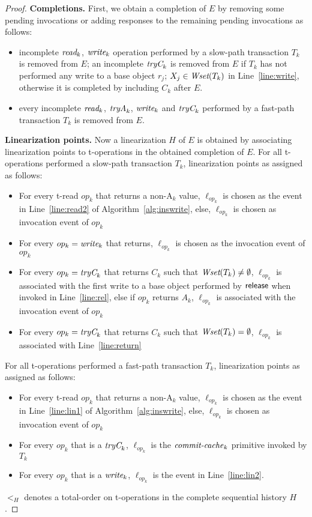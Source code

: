 \begin{proof}
\vspace{1mm}\noindent\textbf{Completions.}
First, we obtain a completion of $E$ by removing some pending
invocations or adding responses to the remaining pending invocations
as follows:
%
\begin{itemize}
\item
incomplete $\textit{read}_k$, $\textit{write}_k$ operation performed by a slow-path transaction $T_k$ is removed from $E$;
an incomplete $\textit{tryC}_k$ is removed from $E$ if $T_k$ has not performed any write to a base object $r_j$; $X_j \in \textit{Wset}(T_k)$
in Line~\ref{line:write}, otherwise it is completed by including $C_k$ after $E$.
\item
every incomplete $\textit{read}_k$, $\textit{tryA}_k$, $\textit{write}_k$ and $\textit{tryC}_k$ performed by a fast-path transaction $T_k$ is removed from $E$.
\end{itemize}
%
\vspace{1mm}\noindent\textbf{Linearization points.}
Now a linearization $H$ of $E$ is obtained by associating linearization points to
t-operations in the obtained completion of $E$.
For all t-operations performed a slow-path transaction $T_k$, linearization points as assigned as follows:
%
\begin{itemize}
\item For every t-read $op_k$ that returns a non-A$_k$ value, $\ell_{op_k}$ is chosen as the event in Line~\ref{line:read2}
of Algorithm~\ref{alg:inswrite}, else, $\ell_{op_k}$ is chosen as invocation event of $op_k$
\item For every $op_k=\textit{write}_k$ that returns, $\ell_{op_k}$ is chosen as the invocation event of $op_k$
\item For every $op_k=\textit{tryC}_k$ that returns $C_k$ such that $\textit{Wset}(T_k)
  \neq \emptyset$, $\ell_{op_k}$ is associated with the first write to a base object performed by $\lit{release}$
  when invoked in Line~\ref{line:rel}, 
  else if $op_k$ returns $A_k$, $\ell_{op_k}$ is associated with the invocation event of $op_k$
\item For every $op_k=\textit{tryC}_k$ that returns $C_k$ such that $\textit{Wset}(T_k) = \emptyset$, 
$\ell_{op_k}$ is associated with Line~\ref{line:return}
\end{itemize}
%
For all t-operations performed a fast-path transaction $T_k$, linearization points as assigned as follows:
\begin{itemize}
\item For every t-read $op_k$ that returns a non-A$_k$ value, $\ell_{op_k}$ is chosen as the event in Line~\ref{line:lin1}
of Algorithm~\ref{alg:inswrite}, else, $\ell_{op_k}$ is chosen as invocation event of $op_k$
\item
For every $op_k$ that is a $\textit{tryC}_k$, $\ell_{op_k}$ is the $\ms{commit-cache}_k$ primitive invoked by $T_k$
\item
For every $op_k$ that is a $\textit{write}_k$, $\ell_{op_k}$ is the event in Line~\ref{line:lin2}.
\end{itemize}
%
$<_H$ denotes a total-order on t-operations in the complete sequential history $H$.


\end{proof}
